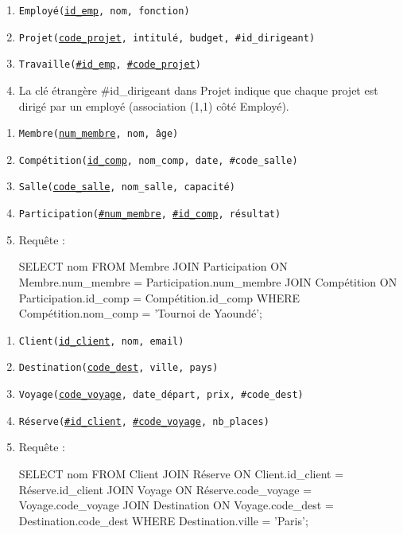 \begin{enumerate}
    \item \texttt{Employé(\underline{id\_emp}, nom, fonction)}
    \item \texttt{Projet(\underline{code\_projet}, intitulé, budget, \#id\_dirigeant)}
    \item \texttt{Travaille(\underline{\#id\_emp}, \underline{\#code\_projet})}
    \item La clé étrangère \#id\_dirigeant dans Projet indique que chaque projet est dirigé par un employé (association (1,1) côté Employé).
\end{enumerate}

\begin{enumerate}
    \item \texttt{Membre(\underline{num\_membre}, nom, âge)}
    \item \texttt{Compétition(\underline{id\_comp}, nom\_comp, date, \#code\_salle)}
    \item \texttt{Salle(\underline{code\_salle}, nom\_salle, capacité)}
    \item \texttt{Participation(\underline{\#num\_membre}, \underline{\#id\_comp}, résultat)}
    \item Requête :
    \begin{sqlcode}
SELECT nom FROM Membre
JOIN Participation ON Membre.num_membre = Participation.num_membre
JOIN Compétition ON Participation.id_comp = Compétition.id_comp
WHERE Compétition.nom_comp = 'Tournoi de Yaoundé';
    \end{sqlcode}
\end{enumerate}

\begin{enumerate}
    \item \texttt{Client(\underline{id\_client}, nom, email)}
    \item \texttt{Destination(\underline{code\_dest}, ville, pays)}
    \item \texttt{Voyage(\underline{code\_voyage}, date\_départ, prix, \#code\_dest)}
    \item \texttt{Réserve(\underline{\#id\_client}, \underline{\#code\_voyage}, nb\_places)}
    \item Requête :
    \begin{sqlcode}
SELECT nom FROM Client
JOIN Réserve ON Client.id_client = Réserve.id_client
JOIN Voyage ON Réserve.code_voyage = Voyage.code_voyage
JOIN Destination ON Voyage.code_dest = Destination.code_dest
WHERE Destination.ville = 'Paris';
    \end{sqlcode}
\end{enumerate}

